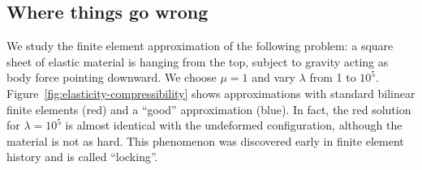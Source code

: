 \subsection{Where things go wrong}
\begin{example}
  We study the finite element approximation of the following problem:
  a square sheet of elastic material is hanging from the top, subject
  to gravity acting as body force pointing downward. We choose $\mu=1$
  and vary $\lambda$ from 1 to
  $10^5$. Figure~\ref{fig:elasticity-compressibility} shows
  approximations with standard bilinear finite elements (red) and a
  ``good'' approximation (blue). In fact, the red solution for
  $\lambda = 10^5$ is almost identical with the undeformed
  configuration, although the material is not as hard. This phenomenon
  was discovered early in finite element history and is called
  ``locking''.
\end{example}

